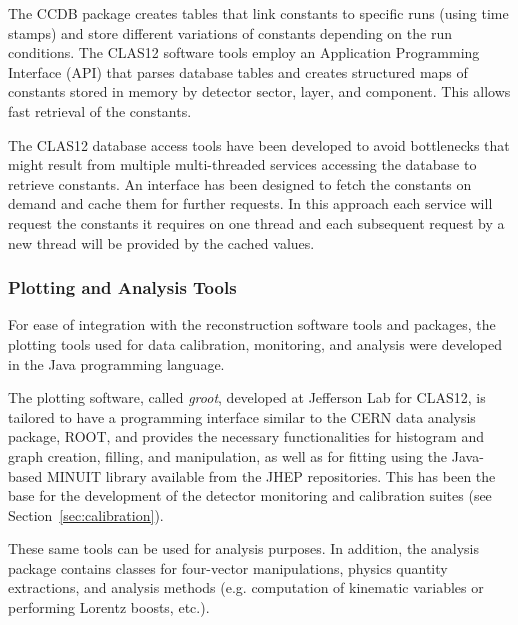 The CCDB package creates tables that link constants to specific runs (using time stamps) and store different
variations of constants depending on the run conditions. The CLAS12 software tools employ an Application
Programming Interface (API) that parses database tables and creates structured maps of constants stored in
memory by detector sector, layer, and component. This allows fast retrieval of the constants.

The CLAS12 database access tools have been developed to avoid bottlenecks that might result from multiple
multi-threaded services accessing the database to retrieve constants.  An interface has been designed to fetch
the constants on demand and cache them for further requests. In this approach each service will request the
constants it requires on one thread and each subsequent request by a new thread will be provided by the cached
values.

\subsubsection{Plotting and Analysis Tools}

For ease of integration with the reconstruction software tools and packages, the plotting tools used for data
calibration, monitoring, and analysis were developed in the Java programming language.

The plotting software, called {\it groot}, developed at Jefferson Lab for CLAS12, is tailored to have a programming
interface similar to the CERN data analysis package, ROOT, and provides the necessary functionalities for
histogram and graph creation, filling, and manipulation, as well as for fitting using the Java-based MINUIT library
available from the JHEP repositories. This has been the base for the development of the detector monitoring and
calibration suites (see Section~\ref{sec:calibration}).

These same tools can be used for analysis purposes. In addition, the analysis package contains classes for four-vector
manipulations, physics quantity extractions, and analysis methods (e.g. computation of kinematic variables or
performing Lorentz boosts, etc.).

